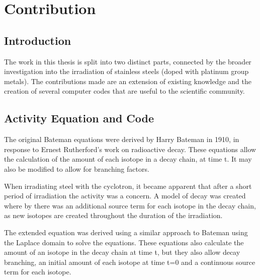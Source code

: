 \section{Contribution}

\subsection{Introduction}

The work in this thesis is split into two distinct parts, connected by the broader investigation into the irradiation of stainless steels (doped with platinum group metals).  The contributions made are an extension of existing knowledge and the creation of several computer codes that are useful to the scientific community.

\subsection{Activity Equation and Code}

The original Bateman equations were derived by Harry Bateman in 1910, in response to Ernest Rutherford's work on radioactive decay.  These equations allow the calculation of the amount of each isotope in a decay chain, at time t.  It may also be modified to allow for branching factors.

When irradiating steel with the cyclotron, it became apparent that after a short period of irradiation the activity was a concern.  A model of decay was created where by there was an additional source term for each isotope in the decay chain, as new isotopes are created throughout the duration of the irradiation.  

The extended equation was derived using a similar approach to Bateman using the Laplace domain to solve the equations.  These equations also calculate the amount of an isotope in the decay chain at time t, but they also allow decay branching, an initial amount of each isotope at time t=0 and a continuous source term for each isotope.




